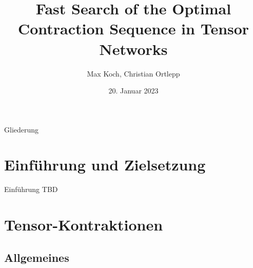 \documentclass{beamer}
\title{Fast Search of the Optimal Contraction Sequence in Tensor Networks}
\author{Max Koch, Christian Ortlepp}
\institute{Friedrich-Schiller-Universität Jena}
\date{20. Januar 2023}
\begin{document}
\begin{frame}
	\titlepage
  \end{frame}

\begin{frame}{Gliederung}
	\tableofcontents
\end{frame}

\section{Einführung und Zielsetzung}
\begin{frame}{Einführung}
	TBD
\end{frame}

\section{Tensor-Kontraktionen}
\subsection{Allgemeines}
\end{document}
